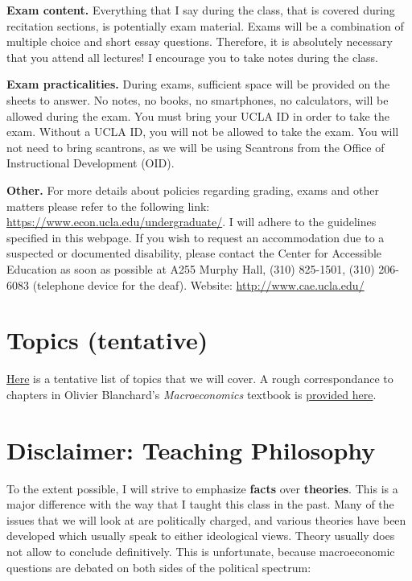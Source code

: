 \documentclass[]{book}
\theoremstyle{definition}
\theoremstyle{definition}
\theoremstyle{definition}
\theoremstyle{remark}
\begin{document}
\textbf{Exam content.} Everything that I say during the class, that is
covered during recitation sections, is potentially exam material. Exams
will be a combination of multiple choice and short essay questions.
Therefore, it is absolutely necessary that you attend all lectures! I
encourage you to take notes during the class.

\textbf{Exam practicalities.} During exams, sufficient space will be
provided on the sheets to answer. No notes, no books, no smartphones, no
calculators, will be allowed during the exam. You must bring your UCLA
ID in order to take the exam. Without a UCLA ID, you will not be allowed
to take the exam. You will not need to bring scantrons, as we will be
using Scantrons from the Office of Instructional Development (OID).

\textbf{Other.} For more details about policies regarding grading, exams
and other matters please refer to the following link:
\url{https://www.econ.ucla.edu/undergraduate/}. I will adhere to the
guidelines specified in this webpage. If you wish to request an
accommodation due to a suspected or documented disability, please
contact the Center for Accessible Education as soon as possible at A255
Murphy Hall, (310) 825-1501, (310) 206-6083 (telephone device for the
deaf). Website: \url{http://www.cae.ucla.edu/}

\section*{Topics (tentative)}\label{topics-tentative}

\href{timetable.html}{Here} is a tentative list of topics that we will
cover. A rough correspondance to chapters in Olivier Blanchard's
\emph{Macroeconomics} textbook is
\href{https://docs.google.com/spreadsheets/d/1OQzilQvOLusOsv16pJ3FgFN1YAadELe64jJAV2PEsF0/edit?usp=sharing}{provided
here}.

\section*{Disclaimer: Teaching
Philosophy}\label{disclaimer-teaching-philosophy}

To the extent possible, I will strive to emphasize \textbf{facts} over
\textbf{theories}. This is a major difference with the way that I taught
this class in the past. Many of the issues that we will look at are
politically charged, and various theories have been developed which
usually speak to either ideological views. Theory usually does not allow
to conclude definitively. This is unfortunate, because macroeconomic
questions are debated on both sides of the political spectrum:
\end{document}
